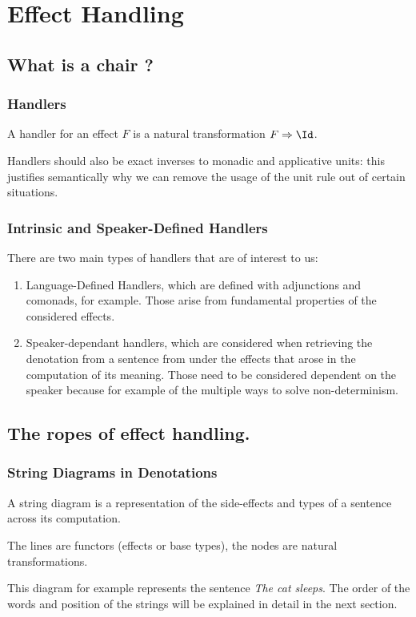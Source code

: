 \documentclass[math, english, info]{beamercours}
\begin{document}
\section{Effect Handling}
\subsection{What is a chair ?}
\begin{frame}
	\frametitle{Handlers}
	A handler for an effect $F$ is a natural transformation $F \Rightarrow \Id$.

	\smallskip

	Handlers should also be exact inverses to monadic and applicative units:
	this justifies semantically why we can remove the usage of the unit rule out
	of certain situations.
\end{frame}


\begin{frame}
	\frametitle{Intrinsic and Speaker-Defined Handlers}
	There are two main types of handlers that are of interest to us:
	\pause
	\begin{enumerate}
		\item Language-Defined Handlers, which are defined with
		      adjunctions and comonads, for example.
		      Those arise from fundamental properties of the considered effects.
		      \pause
		\item Speaker-dependant handlers, which are considered when
		      retrieving the denotation from a sentence from under the effects
		      that arose in the computation of its meaning.
		      Those need to be considered dependent on the speaker because for
		      example of the multiple ways to solve non-determinism.
	\end{enumerate}
\end{frame}

\subsection{The ropes of effect handling.}
\begin{frame}[allowframebreaks]
	\frametitle{String Diagrams in Denotations}
	A string diagram is a representation of the side-effects and types of a
	sentence across its computation.

	\smallskip

	The lines are functors (effects or base types), the nodes are natural
	transformations.

	\begin{center}
		\hfill
		\hfill
		\begin{minipage}[b]{.4\textwidth}
			This diagram for example represents the sentence \textsl{The cat sleeps}.
			The order of the words and position of the strings will be explained in
			detail in the next section.
		\end{minipage}
		\hfill
	\end{center}
\end{frame}
\end{document}
